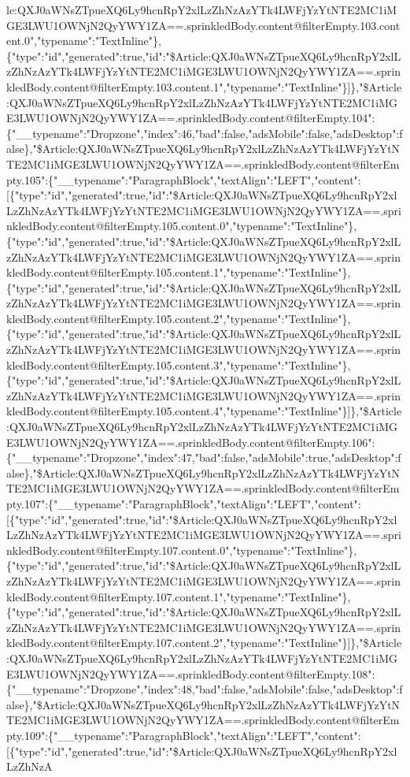 le:QXJ0aWNsZTpueXQ6Ly9hcnRpY2xlLzZhNzAzYTk4LWFjYzYtNTE2MC1iMGE3LWU1OWNjN2QyYWY1ZA==.sprinkledBody.content@filterEmpty.103.content.0","typename":"TextInline"\},\{"type":"id","generated":true,"id":"\$Article:QXJ0aWNsZTpueXQ6Ly9hcnRpY2xlLzZhNzAzYTk4LWFjYzYtNTE2MC1iMGE3LWU1OWNjN2QyYWY1ZA==.sprinkledBody.content@filterEmpty.103.content.1","typename":"TextInline"\}{]}\},"\$Article:QXJ0aWNsZTpueXQ6Ly9hcnRpY2xlLzZhNzAzYTk4LWFjYzYtNTE2MC1iMGE3LWU1OWNjN2QyYWY1ZA==.sprinkledBody.content@filterEmpty.104":\{"\_\_typename":"Dropzone","index":46,"bad":false,"adsMobile":false,"adsDesktop":false\},"\$Article:QXJ0aWNsZTpueXQ6Ly9hcnRpY2xlLzZhNzAzYTk4LWFjYzYtNTE2MC1iMGE3LWU1OWNjN2QyYWY1ZA==.sprinkledBody.content@filterEmpty.105":\{"\_\_typename":"ParagraphBlock","textAlign":"LEFT","content":{[}\{"type":"id","generated":true,"id":"\$Article:QXJ0aWNsZTpueXQ6Ly9hcnRpY2xlLzZhNzAzYTk4LWFjYzYtNTE2MC1iMGE3LWU1OWNjN2QyYWY1ZA==.sprinkledBody.content@filterEmpty.105.content.0","typename":"TextInline"\},\{"type":"id","generated":true,"id":"\$Article:QXJ0aWNsZTpueXQ6Ly9hcnRpY2xlLzZhNzAzYTk4LWFjYzYtNTE2MC1iMGE3LWU1OWNjN2QyYWY1ZA==.sprinkledBody.content@filterEmpty.105.content.1","typename":"TextInline"\},\{"type":"id","generated":true,"id":"\$Article:QXJ0aWNsZTpueXQ6Ly9hcnRpY2xlLzZhNzAzYTk4LWFjYzYtNTE2MC1iMGE3LWU1OWNjN2QyYWY1ZA==.sprinkledBody.content@filterEmpty.105.content.2","typename":"TextInline"\},\{"type":"id","generated":true,"id":"\$Article:QXJ0aWNsZTpueXQ6Ly9hcnRpY2xlLzZhNzAzYTk4LWFjYzYtNTE2MC1iMGE3LWU1OWNjN2QyYWY1ZA==.sprinkledBody.content@filterEmpty.105.content.3","typename":"TextInline"\},\{"type":"id","generated":true,"id":"\$Article:QXJ0aWNsZTpueXQ6Ly9hcnRpY2xlLzZhNzAzYTk4LWFjYzYtNTE2MC1iMGE3LWU1OWNjN2QyYWY1ZA==.sprinkledBody.content@filterEmpty.105.content.4","typename":"TextInline"\}{]}\},"\$Article:QXJ0aWNsZTpueXQ6Ly9hcnRpY2xlLzZhNzAzYTk4LWFjYzYtNTE2MC1iMGE3LWU1OWNjN2QyYWY1ZA==.sprinkledBody.content@filterEmpty.106":\{"\_\_typename":"Dropzone","index":47,"bad":false,"adsMobile":true,"adsDesktop":false\},"\$Article:QXJ0aWNsZTpueXQ6Ly9hcnRpY2xlLzZhNzAzYTk4LWFjYzYtNTE2MC1iMGE3LWU1OWNjN2QyYWY1ZA==.sprinkledBody.content@filterEmpty.107":\{"\_\_typename":"ParagraphBlock","textAlign":"LEFT","content":{[}\{"type":"id","generated":true,"id":"\$Article:QXJ0aWNsZTpueXQ6Ly9hcnRpY2xlLzZhNzAzYTk4LWFjYzYtNTE2MC1iMGE3LWU1OWNjN2QyYWY1ZA==.sprinkledBody.content@filterEmpty.107.content.0","typename":"TextInline"\},\{"type":"id","generated":true,"id":"\$Article:QXJ0aWNsZTpueXQ6Ly9hcnRpY2xlLzZhNzAzYTk4LWFjYzYtNTE2MC1iMGE3LWU1OWNjN2QyYWY1ZA==.sprinkledBody.content@filterEmpty.107.content.1","typename":"TextInline"\},\{"type":"id","generated":true,"id":"\$Article:QXJ0aWNsZTpueXQ6Ly9hcnRpY2xlLzZhNzAzYTk4LWFjYzYtNTE2MC1iMGE3LWU1OWNjN2QyYWY1ZA==.sprinkledBody.content@filterEmpty.107.content.2","typename":"TextInline"\}{]}\},"\$Article:QXJ0aWNsZTpueXQ6Ly9hcnRpY2xlLzZhNzAzYTk4LWFjYzYtNTE2MC1iMGE3LWU1OWNjN2QyYWY1ZA==.sprinkledBody.content@filterEmpty.108":\{"\_\_typename":"Dropzone","index":48,"bad":false,"adsMobile":false,"adsDesktop":false\},"\$Article:QXJ0aWNsZTpueXQ6Ly9hcnRpY2xlLzZhNzAzYTk4LWFjYzYtNTE2MC1iMGE3LWU1OWNjN2QyYWY1ZA==.sprinkledBody.content@filterEmpty.109":\{"\_\_typename":"ParagraphBlock","textAlign":"LEFT","content":{[}\{"type":"id","generated":true,"id":"\$Article:QXJ0aWNsZTpueXQ6Ly9hcnRpY2xlLzZhNzA